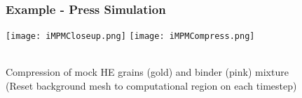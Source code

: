 \documentclass{beamer}
\begin{document}

\begin{frame}
\begin{center}
\frametitle{Example - Press Simulation}

\texttt{[image: iMPMCloseup.png]}
\hspace*{1cm}
\texttt{[image: iMPMCompress.png]}

~\\

Compression of mock HE grains (gold) and binder (pink) mixture\\

(Reset background mesh to computational region on each timestep)

\end{center}
\end{frame}

\end{document}

